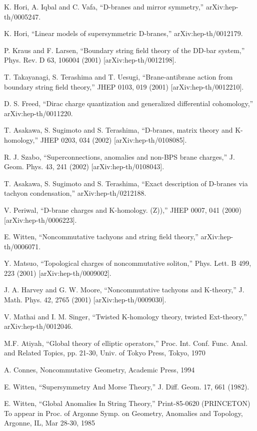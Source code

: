 \documentclass[11pt,a4paper]{ctexart}
\begin{document}
\begin{enumerate}[label={[\arabic*]},leftmargin=*,itemsep=2pt]
\item K. Hori, A. Iqbal and C. Vafa, “D-branes and mirror symmetry,” arXiv:hep- th/0005247.
\item K. Hori, “Linear models of supersymmetric D-branes,” arXiv:hep-th/0012179.
\item P. Kraus and F. Larsen, “Boundary string field theory of the DD-bar system,” Phys. Rev. D 63, 106004 (2001) [arXiv:hep-th/0012198].
\item T. Takayanagi, S. Terashima and T. Uesugi, “Brane-antibrane action from boundary string field theory,” JHEP 0103, 019 (2001) [arXiv:hep-th/0012210].
\item D. S. Freed, “Dirac charge quantization and generalized differential cohomology,” arXiv:hep-th/0011220.
\item T. Asakawa, S. Sugimoto and S. Terashima, “D-branes, matrix theory and K- homology,” JHEP 0203, 034 (2002) [arXiv:hep-th/0108085].
\item R. J. Szabo, “Superconnections, anomalies and non-BPS brane charges,” J. Geom. Phys. 43, 241 (2002) [arXiv:hep-th/0108043].
\item T. Asakawa, S. Sugimoto and S. Terashima, “Exact description of D-branes via tachyon condensation,” arXiv:hep-th/0212188.
\item V. Periwal, “D-brane charges and K-homology. (Z)),” JHEP 0007, 041 (2000) [arXiv:hep-th/0006223].
\item E. Witten, “Noncommutative tachyons and string field theory,” arXiv:hep-th/0006071.
\item Y. Matsuo, “Topological charges of noncommutative soliton,” Phys. Lett. B 499, 223 (2001) [arXiv:hep-th/0009002].
\item J. A. Harvey and G. W. Moore, “Noncommutative tachyons and K-theory,” J. Math. Phys. 42, 2765 (2001) [arXiv:hep-th/0009030].
\item V. Mathai and I. M. Singer, “Twisted K-homology theory, twisted Ext-theory,” arXiv:hep-th/0012046.
\item M.F. Atiyah, “Global theory of elliptic operators,” Proc. Int. Conf. Func. Anal. and Related Topics, pp. 21-30, Univ. of Tokyo Press, Tokyo, 1970
\item A. Connes, Noncommutative Geometry, Academic Press, 1994
\item E. Witten, “Supersymmetry And Morse Theory,” J. Diff. Geom. 17, 661 (1982).
\item E. Witten, “Global Anomalies In String Theory,” Print-85-0620 (PRINCETON) To appear in Proc. of Argonne Symp. on Geometry, Anomalies and Topology, Argonne, IL, Mar 28-30, 1985

\end{enumerate}
\end{document}
